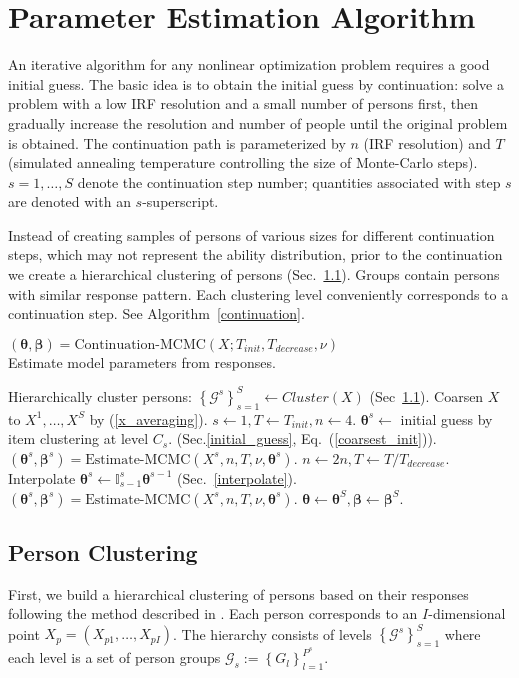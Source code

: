 \documentclass{article}
\newcommand{\bbeta}{\boldsymbol\beta}
\newcommand{\bta}{\boldsymbol\ta}
\newcommand{\cG}{\mathcal{G}}
\newcommand{\ta}{\theta}
\newcommand{\lla}{\longleftarrow}
\newcommand{\I}{\mathbb{I}}
\begin{document}
\section{Parameter Estimation Algorithm}
An iterative algorithm for any nonlinear optimization problem requires a good initial guess. The basic idea is to obtain the initial guess by continuation: solve a problem with a low IRF resolution and a small number of persons first, then gradually increase the resolution and number of people until the original problem is obtained. The continuation path is parameterized by $n$ (IRF resolution) and $T$ (simulated annealing temperature controlling the size of Monte-Carlo steps). $s=1,\dots,S$ denote the continuation step number; quantities associated with step $s$ are denoted with an $s$-superscript.

Instead of creating samples of persons of various sizes for different continuation steps, which may not represent the ability distribution, prior to the continuation we create a hierarchical clustering of persons (Sec.~\ref{miniclustering}). Groups contain persons with similar response pattern. Each clustering level conveniently corresponds to a continuation step. See Algorithm~\ref{continuation}.

\begin{algorithm}
	\label{continuation}
	\caption[]{$(\bta, \bbeta) = {\mbox{Continuation-MCMC}}(X; T_{init}, T_{decrease}, \nu)$\\\hspace{\textwidth}Estimate model parameters from responses.}
	\begin{algorithmic}
    \STATE Hierarchically cluster persons: $\left\{\cG^s\right\}_{s=1}^S \lla Cluster(X)$ (Sec~\ref{miniclustering}).
    \STATE Coarsen $X$ to $X^1,\dots,X^S$ by (\ref{x_averaging}).
    \STATE $s \lla 1, T \lla T_{init}, n \lla 4$.
    \STATE $\bta^s \lla$ initial guess by item clustering at level $C_s$. (Sec.\ref{initial_guess}, Eq.~(\ref{coarsest_init})).
    \STATE $(\bta^s, \bbeta^s) = {\mbox{Estimate-MCMC}}(X^s, n, T, \nu, \bta^s)$.
    	\STATE $n \lla 2 n, T \lla T / T_{decrease}$.
    	\STATE Interpolate $\bta^s \lla \I_{s-1}^s \bta^{s-1}$ (Sec.~\ref{interpolate}). 
	    \STATE $(\bta^s, \bbeta^s) = {\mbox{Estimate-MCMC}}(X^s, n, T, \nu, \bta^s)$.
   	\ENDFOR
   	\STATE $\bta \lla \bta^S, \bbeta \lla \bbeta^S$.
	\end{algorithmic}
\end{algorithm}

\subsection{Person Clustering}
\label{miniclustering}
First, we build a hierarchical clustering of persons based on their responses following the method described in \cite{miniclustering}. Each person corresponds to an $I$-dimensional point $X_p = (X_{p1},\dots,X_{pI})$. The hierarchy consists of levels $\left\{\cG^s\right\}_{s=1}^S$ where each level is a set of person groups $\cG_s := \left\{G_l\right\}_{l=1}^{P^s}$.
\end{document}
